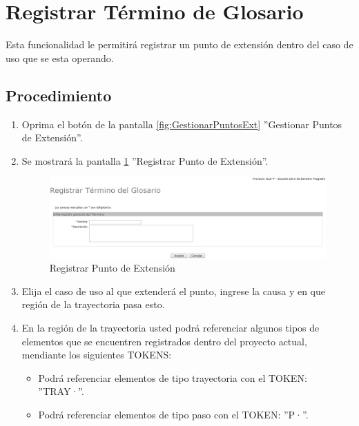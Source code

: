 
\hypertarget{cv:registrarPExt}{\section{Registrar Término de Glosario}} \label{sec:registrarPExt}

	Esta funcionalidad le permitirá registrar un punto de extensión dentro del caso de uso que se esta operando. 

		\subsection{Procedimiento}

			\begin{enumerate}
	
			\item Oprima el botón \IURegistrar{} de la pantalla \ref{fig:GestionarPuntosExt} ''Gestionar Puntos de Extensión''.
			
			\item Se mostrará la pantalla \ref{fig:registrarPExt} ''Registrar Punto de Extensión''.

			\begin{figure}[H]
				\begin{center}
					\includegraphics[scale=0.5]{roles/lider/glosario/pantallas/IU6-1registrarTermino}
					\caption{Registrar Punto de Extensión}
					\label{fig:registrarPExt}
				\end{center}
			\end{figure}
		
			\item Elija el caso de uso al que extenderá el punto, ingrese la causa y en que región de la trayectoria pasa esto.
			
			\item En la región de la trayectoria usted podrá referenciar algunos tipos de elementos que se encuentren registrados dentro del proyecto actual, mendiante los siguientes TOKENS:
			
			\begin{itemize}
				\item Podrá referenciar elementos de tipo trayectoria con el TOKEN: ''TRAY·''.
				\item Podrá referenciar elementos de tipo paso con el TOKEN: ''P·''.
			\end{itemize}
			

\end{enumerate}
